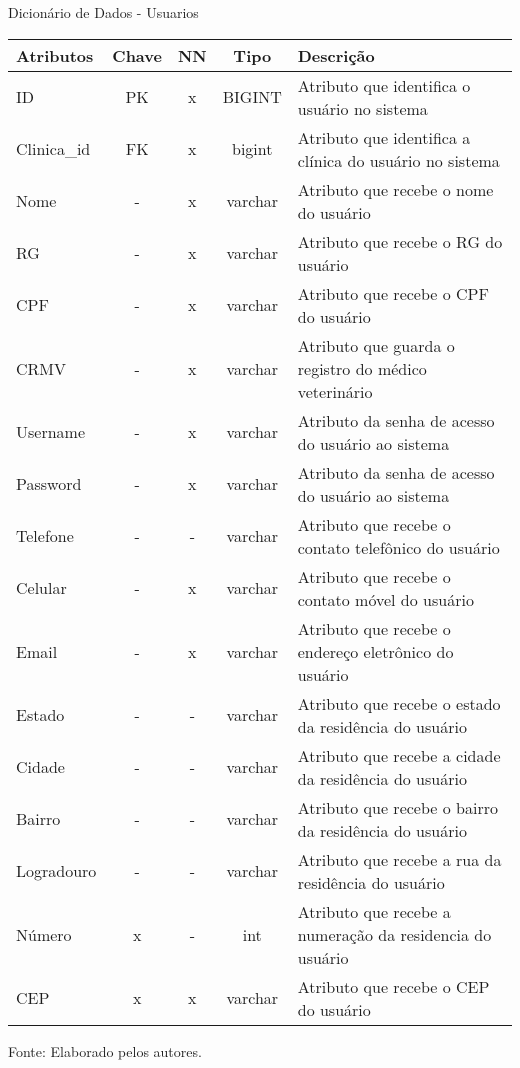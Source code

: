 \documentclass[
    12pt,               %
    openright,          %
    oneside,
    a4paper,            %
    BIBLATEX,           %
    TODO,               %
    english,            %
    brazil              %
    ]{ifsp-spo-inf-ctds}
\begin{document}
    \begin{center}
      \begin{quadro}[H]
      \centering
          \caption{Dicionário de Dados - Usuarios}
          \begin{tabulary}{1.0\textwidth}{|p{9em}|c|c|c|p{19em}|}
        \hline
        Atributos & Chave & NN & Tipo & Descrição\\
        \hline
        ID & PK & x & BIGINT & Atributo que identifica o usuário no sistema \\
        \hline
        Clinica\_id & FK & x & bigint & Atributo que identifica a clínica do usuário no sistema \\
        \hline
        Nome & - & x & varchar & Atributo que recebe o nome do usuário \\
        \hline
        RG & - & x & varchar & Atributo que recebe o RG do usuário\\
        \hline
        CPF & - & x & varchar & Atributo que recebe o CPF do usuário\\
        \hline
        CRMV & - & x & varchar & Atributo que guarda o registro do médico veterinário\\
        \hline
        Username & - & x & varchar & Atributo da senha de acesso do usuário ao sistema\\
        \hline
        Password & - & x & varchar & Atributo da senha de acesso do usuário ao sistema\\
        \hline
        Telefone & - & - & varchar & Atributo que recebe o contato telefônico do usuário\\
        \hline
        Celular & - & x & varchar & Atributo que recebe o contato móvel do usuário \\
        \hline
        Email & - & x & varchar & Atributo que recebe o endereço eletrônico do usuário\\
        \hline
        Estado & - & - & varchar & Atributo que recebe o estado da residência do usuário\\
        \hline
        Cidade & - & - & varchar & Atributo que recebe a cidade da residência do usuário\\
        \hline
        Bairro & - & - & varchar & Atributo que recebe o bairro da residência do usuário\\
        \hline
        Logradouro & - & - & varchar & Atributo que recebe a rua da residência do usuário \\
        \hline
        Número & x & - & int & Atributo que recebe a numeração da residencia do usuário\\
        \hline
        CEP & x & x & varchar & Atributo que recebe o CEP do usuário\\
        \hline
        \end{tabulary}

          \label{qd: md-usuario}
          \centering
        {\footnotesize Fonte: Elaborado pelos autores.}
      \end{quadro}
    \end{center}
\end{document}
